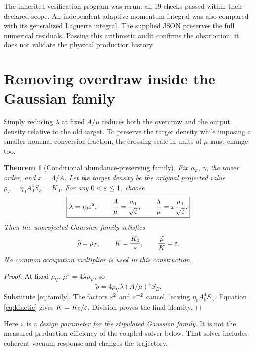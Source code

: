 \documentclass[11pt]{article}
\newtheorem{theorem}{Theorem}[section]
\theoremstyle{definition}\newtheorem{definition}[theorem]{Definition}
\newcommand{\rhoV}{\rho_{\mathrm V}}
\begin{document}
The inherited verification program was rerun: all 19 checks passed within their declared scope. An independent adaptive momentum integral was also compared with its generalized Laguerre integral. The supplied JSON preserves the full numerical residuals. Passing this arithmetic audit confirms the obstruction; it does not validate the physical production history.

\section{Removing overdraw inside the Gaussian family}
Simply reducing $\lambda$ at fixed $A/\mu$ reduces both the overdraw and the output density relative to the old target. To preserve the target density while imposing a smaller nominal conversion fraction, the crossing scale in units of $\mu$ must change too.

\begin{theorem}[Conditional abundance-preserving family]
Fix $\rhoV$, $\gamma$, the tower order, and $x=\Lambda/A$. Let the target density be the original projected value $\rho_T=\eta_0 A_0^4 S_E=K_0$. For any $0<\varepsilon\le1$, choose
\begin{equation}
 \boxed{\lambda=\eta_0\varepsilon^2,\qquad
 \frac A\mu=\frac{a_0}{\sqrt{\varepsilon}},\qquad
 \frac\Lambda\mu=x\frac{a_0}{\sqrt{\varepsilon}}.}
 \label{eq:family}
\end{equation}
Then the unprojected Gaussian family satisfies
\begin{equation}
 \widetilde\rho=\rho_T,\qquad
 K=\frac{K_0}{\varepsilon},\qquad
 \frac{\widetilde\rho}{K}=\varepsilon.
 \label{eq:familyresult}
\end{equation}
No common occupation multiplier is used in this construction.
\end{theorem}
\begin{proof}
At fixed $\rhoV$, $\mu^4=4\lambda\rhoV$, so
\[
 \widetilde\rho=4\rhoV\lambda(A/\mu)^4S_E.
\]
Substitute \eqref{eq:family}. The factors $\varepsilon^2$ and $\varepsilon^{-2}$ cancel, leaving $\eta_0 A_0^4S_E$. Equation \eqref{eq:kinetic} gives $K=K_0/\varepsilon$. Division proves the final identity.
\end{proof}

Here $\varepsilon$ is a \emph{design parameter for the stipulated Gaussian family}. It is not the measured production efficiency of the coupled solver below. That solver includes coherent vacuum response and changes the trajectory.
\end{document}
